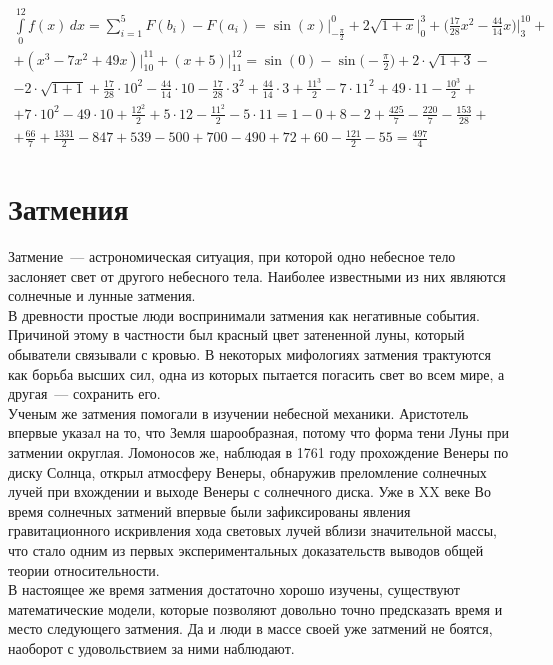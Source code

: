 \documentclass[30pt]{article}
\begin{document}
        \begin{multline}
            \int \limits_{0}^{12} f(x)\,dx = \sum \limits_{i = 1}^{5} F(b_i) - F(a_i) = \sin(x)\left. \right|_{-\frac{\pi}{2}}^{0} + 2 \sqrt{1 + x}\left. \right|_{0}^{3} + \bigg(\frac{17}{28}x^2 - \frac{44}{14}x\bigg)\left. \right|_{3}^{10} + \\
            + (x^3 - 7x ^ 2 + 49x)\left. \right|_{10}^{11} + (x + 5)\left. \right|_{11}^{12} =  \sin(0) - \sin\bigg(-\frac{\pi}{2}\bigg) + 2 \cdot \sqrt{1 + 3} - \\
            -2 \cdot \sqrt{1 + 1} + \frac{17}{28} \cdot 10^2 - \frac{44}{14} \cdot 10 - \frac{17}{28} \cdot 3^2 + \frac{44}{14} \cdot 3 + \frac{11^3}{2} - 7 \cdot 11^2 + 49 \cdot 11 - \frac{10^3}{2} + \\
            + 7 \cdot 10^2 - 49 \cdot 10 + \frac{12^2}{2} + 5 \cdot 12 - \frac{11^2}{2} - 5 \cdot 11 = 1 - 0 + 8 - 2 + \frac{425}{7} - \frac{220}{7} - \frac{153}{28} + \\
            + \frac{66}{7} + \frac{1331}{2} - 847 + 539 - 500 + 700 - 490 + 72 + 60 - \frac{121}{2} - 55 = \frac{497}{4}
            \label{eq:res}
        \end{multline}
    \section{Затмения}
        Затмение~--- астрономическая ситуация, при которой одно небесное тело заслоняет свет от другого небесного тела. Наиболее известными из них являются солнечные и лунные затмения. \\
        В древности простые люди воспринимали затмения как негативные события. Причиной этому в частности был красный цвет затененной луны, который обыватели связывали с кровью. В некоторых мифологиях затмения трактуются как борьба высших сил, одна из которых пытается погасить свет во всем мире, а другая~--- сохранить его. \\
        Ученым же затмения помогали в изучении небесной механики. Аристотель впервые указал на то, что Земля шарообразная, потому что форма тени Луны при затмении округлая. Ломоносов же, наблюдая в 1761 году прохождение Венеры по диску Солнца, открыл атмосферу Венеры,  обнаружив преломление солнечных лучей при вхождении и выходе Венеры с солнечного диска. Уже в XX веке  Во время солнечных затмений впервые были зафиксированы явления гравитационного искривления хода световых лучей вблизи значительной массы, что стало одним из первых экспериментальных доказательств выводов общей теории относительности. \\
        В настоящее же время затмения достаточно хорошо изучены, существуют математические модели, которые позволяют довольно точно предсказать время и место следующего затмения. Да и люди в массе своей уже затмений не боятся, наоборот с удовольствием за ними наблюдают. \\ 
        
\end{document}
